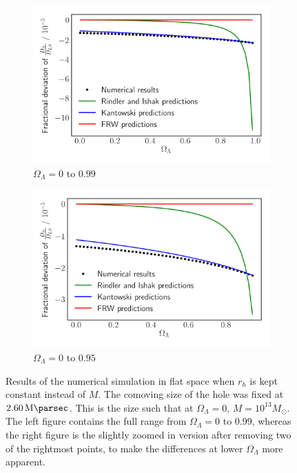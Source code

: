 \begin{figure}
  \centering
  \begin{subfigure}{0.8\textwidth}
    \includegraphics[width=\textwidth]{images/flat_const_rh.png}
    \caption{$\Omega_{\Lambda} = 0$ to $0.99$}
  \end{subfigure}%

  \begin{subfigure}{0.8\textwidth}
    \includegraphics[width=\textwidth]{images/flat_const_rh2.png}
    \caption{$\Omega_{\Lambda} = 0$ to $0.95$}
  \end{subfigure}%
  \caption{Results of the numerical simulation in flat space when $r_h$ is kept constant instead of $M$. The comoving size of the hole was fixed at $\SI{2.60}{\mega\parsec}$. This is the size such that at $\Omega_{\Lambda} = 0$, $M = 10^{13}M_{\odot}$. The left figure contains the full range from $\Omega_{\Lambda} = 0$ to 0.99, whereas the right figure is the slightly zoomed in version after removing two of the rightmost points, to make the differences at lower $\Omega_{\Lambda}$ more apparent.}
  \label{fig:flat-const-rh}
\end{figure}


